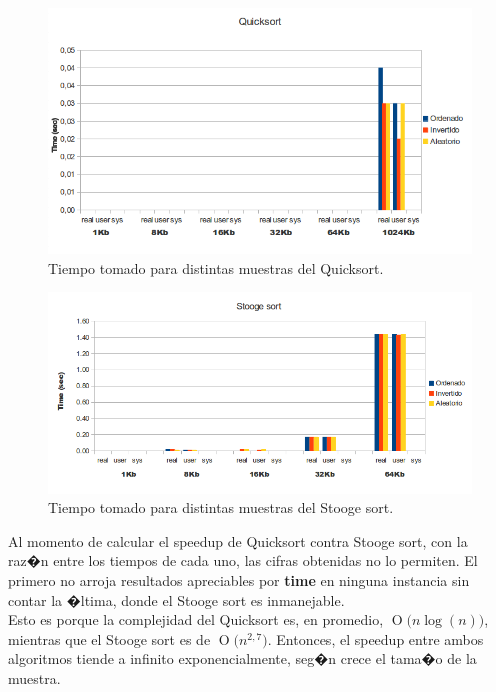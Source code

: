 \documentclass[a4paper,10pt]{article}
\newcommand{\BigO}[1]{\ensuremath{\operatorname{O}\bigl(#1\bigr)}}
\begin{document}
\begin{figure}[!htp]
\begin{center}
\includegraphics[width=1\textwidth]{quicksort.png}
\end{center}
\caption{Tiempo tomado para distintas muestras del Quicksort.} \label{fig001}
\end{figure}

\begin{figure}[!htp]
\begin{center}
\includegraphics[width=1.1\textwidth]{stoogesort.png}
\end{center}
\caption{Tiempo tomado para distintas muestras del Stooge sort.} \label{fig002}
\end{figure}


Al momento de calcular el speedup de Quicksort contra Stooge sort, con la raz�n entre los tiempos de cada uno, las cifras obtenidas no lo permiten. El primero no arroja resultados apreciables por \textbf{time} en ninguna instancia sin contar la �ltima, donde el Stooge sort es inmanejable.\\
Esto es porque la complejidad del Quicksort es, en promedio, \BigO{n \log(n)}, mientras que el Stooge sort es de \BigO{n^{2,7}}. Entonces, el speedup entre ambos algoritmos tiende a infinito exponencialmente, seg�n crece el tama�o de la muestra.  
\end{document}
